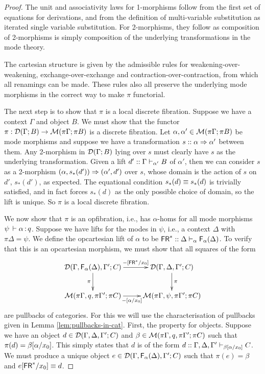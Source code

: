 \begin{proof}
The unit and associativity laws for 1-morphisms follow from the first set of equations for derivations, and from the definition of multi-variable substitution as iterated single variable substitution. For 2-morphisms, they follow as composition of 2-morphisms is simply composition of the underlying transformations in the mode theory.

The cartesian structure is given by the admissible rules for weakening-over-weakening, exchange-over-exchange and contraction-over-contraction, from which all renamings can be made. These rules also all preserve the underlying mode morphisms in the correct way to make $\pi$ functorial.

The next step is to show that $\pi$ is a local discrete fibration. Suppose we have a context $\Gamma$ and object $B$. We must show that the functor $\pi : \mathcal{D}(\Gamma; B) \to \mathcal{M}(\pi \Gamma; \pi B)$ is a discrete fibration. Let $\alpha, \alpha' \in \mathcal{M}(\pi \Gamma; \pi B)$ be mode morphisms and suppose we have a transformation $s :: \alpha \Rightarrow \alpha'$ between them. Any 2-morphism in $\mathcal{D}(\Gamma; B)$ lying over $s$ must clearly have $s$ as the underlying transformation. Given a lift $d' :: \Gamma \vdash_{\alpha'} B$ of $\alpha'$, then we can consider $s$ as a 2-morphism $(\alpha, s_*(d')) \Rightarrow (\alpha',d')$ over $s$, whose domain is the action of $s$ on $d'$, $s_*(d')$, as expected.
The equational condition $s_*(d) \equiv s_*(d)$ is trivially satisfied, and in fact forces $s_*(d)$ as the only possible choice of domain, so the lift is unique. So $\pi$ is a local discrete fibration.

We now show that $\pi$ is an opfibration, i.e., has $\alpha$-homs for all mode morphisms $\psi \, \vdash \alpha \, \mathit{:} \, q$. Suppose we have lifts for the modes in $\psi$, i.e., a context $\Delta$ with $\pi\Delta = \psi$. We define the opcartesian lift of $\alpha$ to be $\mathsf{FR}^* :: \Delta \vdash_{\alpha} \mathsf{F}_{\alpha}(\Delta)$. To verify that this is an opcartesian morphism, we must show that all squares of the form
\[ \xymatrix{
    \cD(\Gamma,\F{\alpha}{\Delta},\Gamma';C) \ar[r]^-{\Cut{-}{\FR^*}{x_0}} \ar[d]_\pi &
    \cD(\Gamma,\Delta,\Gamma';C) \ar[d]^\pi \\
    \M(\pi \Gamma, q, \pi \Gamma'; \pi C) \ar[r]_-{\Cut{-}{\alpha}{x_0}} &
    \M(\pi\Gamma,\psi,\pi\Gamma'; \pi C)
}\]
are pullbacks of categories. For this we will use the characterisation of pullbacks given in Lemma \ref{lem:pullbacks-in-cat}. First, the property for objects. Suppose we have an object $d \in \mathcal{D}(\Gamma,\Delta,\Gamma';C)$ and $\beta \in \mathcal{M}(\pi \Gamma, q,\pi \Gamma'; \pi C)$ such that $\pi(d) = \beta[\alpha/x_0]$. This simply states that $d$ is of the form $d :: \Gamma, \Delta, \Gamma' \vdash_{\beta[\alpha/x_0]} C$. We must produce a unique object $e \in \mathcal{D}(\Gamma,\mathsf{F}_{\alpha}(\Delta),\Gamma';C)$ such that $\pi(e) = \beta$ and $e[\mathsf{FR}^*/x_0] \equiv d$.


\end{proof}
